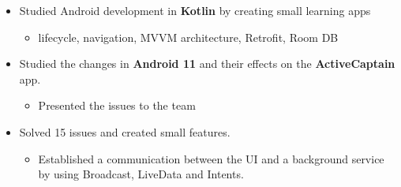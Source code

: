 

\begin{itemize}

\item Studied Android development in \textbf{Kotlin} by creating small learning apps

\begin{itemize}
 \item lifecycle, navigation, MVVM architecture, Retrofit, Room DB
\end{itemize}

\item Studied the changes in \textbf{Android 11} and their effects on the \textbf{ActiveCaptain} app. 

\begin{itemize}
 \item Presented the issues to the team
\end{itemize}


\item Solved 15 issues and created small features.

\begin{itemize}
 \item Established a communication between the UI and a background service by using Broadcast, LiveData and Intents.
\end{itemize}

\end{itemize}

 
